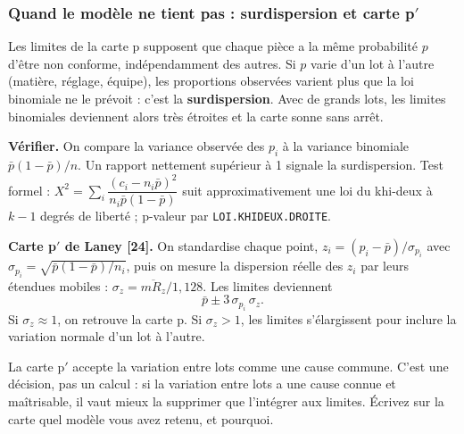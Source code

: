 \documentclass[11pt,a4paper]{article}
\newcommand{\xl}[1]{\texttt{\small #1}}
\begin{document}
\subsubsection{Quand le modèle ne tient pas : surdispersion et carte p\texorpdfstring{$'$}{'}}
Les limites de la carte p supposent que chaque pièce a la même probabilité $p$ d'être non conforme, indépendamment des autres. Si $p$ varie d'un lot à l'autre (matière, réglage, équipe), les proportions observées varient plus que la loi binomiale ne le prévoit : c'est la \textbf{surdispersion}. Avec de grands lots, les limites binomiales deviennent alors très étroites et la carte sonne sans arrêt.

\textbf{Vérifier.} On compare la variance observée des $p_i$ à la variance binomiale $\bar p(1-\bar p)/n$. Un rapport nettement supérieur à 1 signale la surdispersion. Test formel : $X^2=\sum_i\dfrac{(c_i-n_i\bar p)^2}{n_i\bar p(1-\bar p)}$ suit approximativement une loi du khi-deux à $k-1$ degrés de liberté ; p-valeur par \xl{LOI.KHIDEUX.DROITE}.

\textbf{Carte p$'$ de Laney [24].} On standardise chaque point, $z_i=(p_i-\bar p)/\sigma_{p_i}$ avec $\sigma_{p_i}=\sqrt{\bar p(1-\bar p)/n_i}$, puis on mesure la dispersion réelle des $z_i$ par leurs étendues mobiles : $\sigma_z=\overline{mR_z}/1{,}128$. Les limites deviennent
\[
\bar p\pm3\,\sigma_{p_i}\,\sigma_z .
\]
Si $\sigma_z\approx1$, on retrouve la carte p. Si $\sigma_z>1$, les limites s'élargissent pour inclure la variation normale d'un lot à l'autre.

\begin{attention}
La carte p$'$ accepte la variation entre lots comme une cause commune. C'est une décision, pas un calcul : si la variation entre lots a une cause connue et maîtrisable, il vaut mieux la supprimer que l'intégrer aux limites. Écrivez sur la carte quel modèle vous avez retenu, et pourquoi.
\end{attention}
\end{document}
